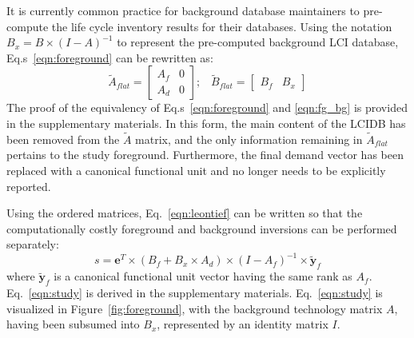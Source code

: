 It is currently common practice for background database maintainers to pre-compute the life cycle inventory results for their databases.  Using the notation $B_x = B \times (I - A)^{-1}$ to represent the pre-computed background LCI database, Eq.s~\ref{eqn:foreground} can be rewritten as:
\begin{equation}
 \tilde{A}_{flat} = \left[\begin{array}{cc} 
A_f &  0 \\
A_d & 0 
   \end{array}\right];\;\;\;  \tilde{B}_{flat} = \left[\begin{array}{cc} B_f & B_x \end{array}\right ]
\label{eqn:fg_bg}
\end{equation}
The proof of the equivalency of Eq.s~\ref{eqn:foreground} and \ref{eqn:fg_bg} is provided in the supplementary materials.  In this form, the main content of the LCIDB has been removed from the $\tilde{A}$ matrix, and the only information remaining in $\tilde{A}_{flat}$ pertains to the study foreground.  Furthermore, the final demand vector has been replaced with a canonical functional unit and no longer needs to be explicitly reported.

Using the ordered matrices, Eq.~\ref{eqn:leontief} can be written so that the computationally costly foreground and background inversions can be performed separately:
\begin{equation}
s = \mathbf{e}^T \times (B_f + B_x\times A_d) \times (I - A_f)^{-1} \times \tilde{\mathbf{y}}_f
\label{eqn:study}
\end{equation}
where $\tilde{\mathbf{y}}_f$ is a canonical functional unit vector having the same rank as $A_f$. Eq.~\ref{eqn:study} is derived in the supplementary materials.
Eq.~\ref{eqn:study} is visualized in Figure~\ref{fig:foreground}, with the background technology matrix $A$, having been subsumed into $B_x$, represented by an identity matrix $I$.  

